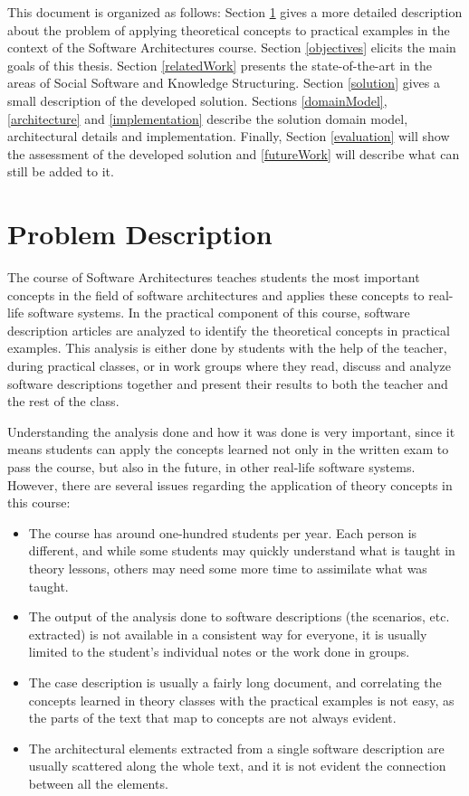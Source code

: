 \documentclass{llncs}
\begin{document}
This document is organized as follows: Section \ref{problemDescription} gives a more detailed description about the problem of applying theoretical concepts to practical examples in the context of the Software Architectures course. Section \ref{objectives} elicits the main goals of this thesis. Section \ref{relatedWork} presents the state-of-the-art in the areas of Social Software and Knowledge Structuring. Section \ref{solution} gives a small description of the developed solution. Sections \ref{domainModel}, \ref{architecture} and \ref{implementation} describe the solution domain model, architectural details and implementation. Finally, Section \ref{evaluation} will show the assessment of the developed solution and \ref{futureWork} will describe what can still be added to it.

\section{Problem Description}
\label{problemDescription}
The course of Software Architectures teaches students the most important concepts in the field of software architectures and applies these concepts to real-life software systems. In the practical component of this course, software description articles are analyzed to identify the theoretical concepts in practical examples. This analysis is either done by students with the help of the teacher, during practical classes, or in work groups where they read, discuss and analyze software descriptions together and present their results to both the teacher and the rest of the class.

Understanding the analysis done and how it was done is very important, since it means students can apply the concepts learned not only in the written exam to pass the course, but also in the future, in other real-life software systems. However, there are several issues regarding the application of theory concepts in this course:
\begin{itemize}
\item The course has around one-hundred students per year. Each person is different, and while some students may quickly understand what is taught in theory lessons, others may need some more time to assimilate what was taught.

\item The output of the analysis done to software descriptions (the scenarios, etc. extracted) is not available in a consistent way for everyone, it is usually limited to the student's individual notes or the work done in groups.

\item The case description is usually a fairly long document, and correlating the concepts learned in theory classes with the practical examples is not easy, as the parts of the text that map to concepts are not always evident.

\item The architectural elements extracted from a single software description are usually scattered along the whole text, and it is not evident the connection between all the elements.
\end{itemize}
\end{document}

